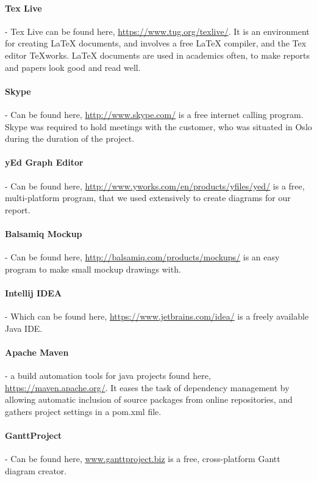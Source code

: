 \documentclass[../document]{subfiles}
\begin{document}
\paragraph{Tex Live} - Tex Live can be found here, \url{https://www.tug.org/texlive/}. It is an environment for creating LaTeX documents, and involves a free LaTeX compiler, and the Tex editor TeXworks. LaTeX documents are used in academics often, to make reports and papers look good and read well.

\paragraph{Skype} - Can be found here, \url{http://www.skype.com/} is a free internet calling program. Skype was required to hold meetings with the customer, who was situated in Oslo during the duration of the project.

\paragraph{yEd Graph Editor} - Can be found here, \url{http://www.yworks.com/en/products/yfiles/yed/} is a free, multi-platform program, that we used extensively to create diagrams for our report.

\paragraph{Balsamiq Mockup} - Can be found here, \url{http://balsamiq.com/products/mockups/} is an easy program to make small mockup drawings with. 

\paragraph{Intellij IDEA} - Which can be found here, \url{https://www.jetbrains.com/idea/} is a freely available Java IDE.

\paragraph{Apache Maven} - a build automation tools for java projects found here, \url{https://maven.apache.org/}. It eases the task of dependency management by allowing automatic inclusion of source packages from online repositories, and gathers project settings in a pom.xml file.

\paragraph{GanttProject} - Can be found here, \url{www.ganttproject.biz} is a free, cross-platform Gantt diagram creator.
\end{document}
